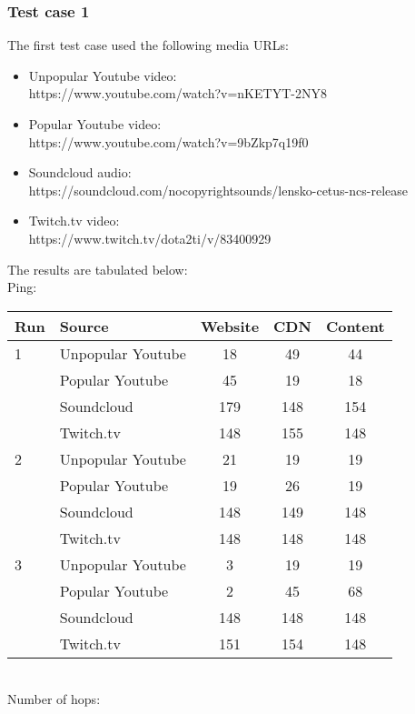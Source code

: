\documentclass{sig-alternate-05-2015}
\begin{document}
\subsubsection{Test case 1}
The first test case used the following media URLs:
\begin{itemize}
	\item Unpopular Youtube video: \\ https://www.youtube.com/watch?v=nKETYT-2NY8
	\item Popular Youtube video: \\ https://www.youtube.com/watch?v=9bZkp7q19f0
	\item Soundcloud audio: \\ https://soundcloud.com/nocopyrightsounds/lensko-cetus-ncs-release
	\item Twitch.tv video: \\ https://www.twitch.tv/dota2ti/v/83400929
\end{itemize}
The results are tabulated below:
\vspace{1em} \\
Ping: \\
\begin{tabular}{|l|l|c|c|c|} \hline
Run & Source & Website & CDN & Content \\ \hline
1 & Unpopular Youtube & 18  & 49  & 44  \\ \hline
  & Popular Youtube   & 45  & 19  & 18  \\ \hline
  & Soundcloud        & 179 & 148 & 154 \\ \hline
  & Twitch.tv         & 148 & 155 & 148 \\ \hline
2 & Unpopular Youtube & 21  & 19  & 19  \\ \hline
  & Popular Youtube   & 19  & 26  & 19  \\ \hline
  & Soundcloud        & 148 & 149 & 148 \\ \hline
  & Twitch.tv         & 148 & 148 & 148 \\ \hline
3 & Unpopular Youtube & 3   & 19  & 19  \\ \hline
  & Popular Youtube   & 2   & 45  & 68  \\ \hline
  & Soundcloud        & 148 & 148 & 148 \\ \hline
  & Twitch.tv         & 151 & 154 & 148 \\ \hline
\end{tabular}
\vspace{1em} \\
Number of hops: \\
\end{document}
